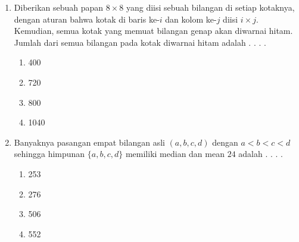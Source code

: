 \documentclass[12pt]{scrartcl}
\begin{document}
\begin{enumerate}[label={Soal \arabic*}]
    \item Diberikan sebuah papan $8\times 8$ yang diisi sebuah bilangan di setiap kotaknya, dengan aturan bahwa kotak di baris ke-$i$ dan kolom ke-$j$ diisi $i\times j$. Kemudian, semua kotak yang memuat bilangan genap akan diwarnai hitam. Jumlah dari semua bilangan pada kotak diwarnai hitam adalah . . . .
    \begin{enumerate}[label={(\Alph*)}]
        \item 400 \item 720 \item 800 \item 1040
    \end{enumerate}

    \item Banyaknya pasangan empat bilangan asli $(a,b,c,d)$ dengan $a<b<c<d$ sehingga himpunan $\{a,b,c,d\}$ memiliki median dan mean $24$ adalah . . . .
    \begin{enumerate}[label={(\Alph*)}]
        \item 253 \item 276 \item 506 \item 552
    \end{enumerate}
\end{enumerate}
\end{document}
